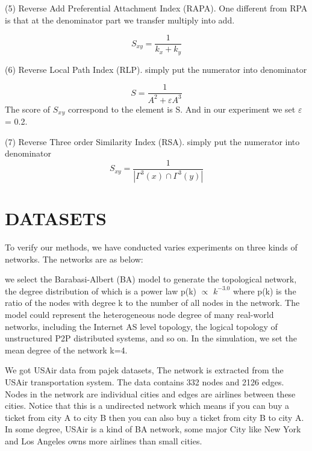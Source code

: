 \documentclass[onecolumn,preprintnumbers,amsmath,amssymb]{revtex4}
\begin{document}
(5) Reverse Add Preferential Attachment Index (RAPA). One different from RPA is that at the denominator part we transfer multiply into add.


\begin{equation}
S_{xy}=\frac{1}{k_x + k_y}
\end{equation}

(6) Reverse Local Path Index (RLP). simply put the numerator into denominator

\begin{equation}
S=\frac{1}{A^2 + \varepsilon A^3}
\end{equation}
The score of $S_x$$_y$ correspond to the element is S. And in our experiment we set 
$\varepsilon$= 0.2.


(7) Reverse Three order Similarity Index (RSA). simply put the numerator into denominator
\begin{equation}
S_{xy}=\frac{1}{ |\Gamma^3(x) \cap \Gamma^3(y)|}
\end{equation}




\section*{DATASETS\protect}
To verify our methods, we have conducted varies experiments on three kinds of networks. The networks are as below:


we select the Barabasi-Albert (BA)\cite{BA} model to generate the topological network, the degree distribution of which is a power law p(k) $\propto$ $k^{-3.0}$ where p(k) is the ratio of the nodes with degree k to the number of all nodes in the network. The model could represent the heterogeneous node degree of many real-world networks, including the Internet AS level topology, the logical topology of unstructured P2P distributed systems, and so on. In the simulation, we set the mean degree of the network k=4.


We got USAir data from pajek datasets, The network is extracted from the USAir transportation system. The data contains 332 nodes and 2126 edges. Nodes in the network are individual cities and edges are airlines between these cities. Notice that this is a undirected network which means if you can buy a ticket from city A to city B then you can also buy a ticket from city B to city A. In some degree, USAir is a kind of BA network, some major City like New York and Los Angeles owns more airlines than small cities.
\end{document}
